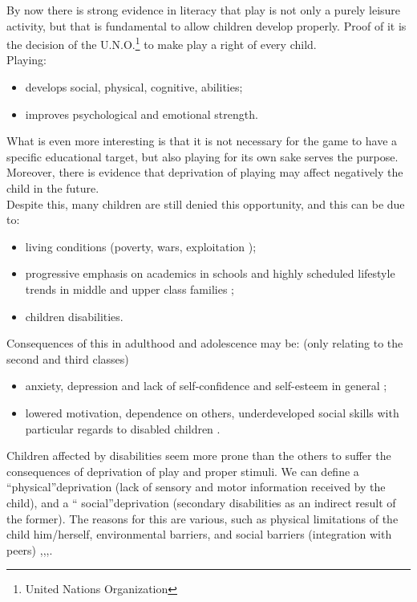 \documentclass[a4paper,twoside]{book}
\begin{document}
By now there is strong evidence in literacy that play is not only a purely leisure activity, but that is fundamental to allow children develop properly. Proof of it is the decision of the U.N.O.\footnote{United Nations Organization} to make play a right of every child. 
\\
Playing:
\begin{itemize}
\item develops social, physical, cognitive, abilities;
\item  improves psychological and emotional strength.
\end{itemize}
What is even more interesting is that it is not necessary for the game to have a specific educational target, but also playing for its own sake serves the purpose. Moreover, there is evidence that  deprivation of playing may affect negatively the child in the future.
\\
Despite this, many children are still denied this opportunity, and this can be due to:
\begin{itemize}
\item living conditions (poverty, wars, exploitation \textellipsis);
\item progressive emphasis on academics in schools and highly scheduled lifestyle trends in middle and upper class families \cite{art4};
\item children disabilities.
\end{itemize}
Consequences of this in adulthood and adolescence may be: (only relating to the second and third classes)
\begin{itemize}
\item  anxiety, depression and lack of self-confidence and self-esteem in general \cite{art4};
\item lowered motivation, dependence on others, underdeveloped social skills with particular regards to disabled children \cite{art9}.
\end{itemize}
Children affected by disabilities seem more prone than the others to suffer the consequences of deprivation of play and proper stimuli. We can define a  \textquotedblleft physical\textquotedblright deprivation (lack of sensory and motor information received by the child), and a \textquotedblleft
 social\textquotedblright deprivation (secondary disabilities as an indirect result of the former). The reasons for this are various, such as physical limitations of the child him/herself, environmental barriers, and social barriers (integration with peers) \cite{art2},\cite{art4},\cite{art8},\cite{art9}.
\end{document}
